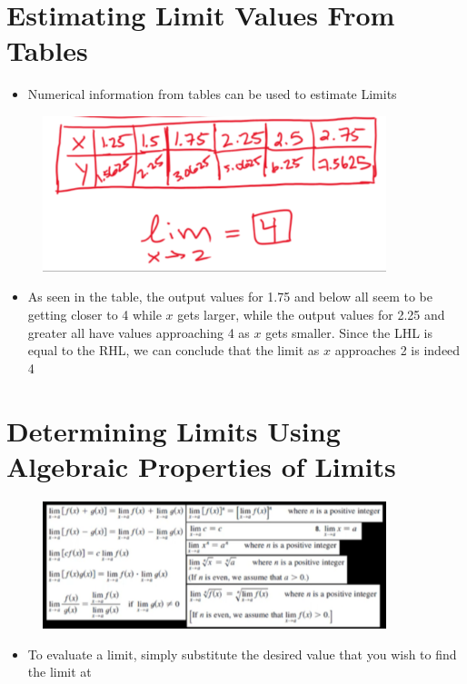 \documentclass{package/notes}
\begin{document}
\section{Estimating Limit Values From Tables}

\begin{itemize}
	\item Numerical information from tables can be used to estimate Limits
\end{itemize}

\begin{figure}
	\begin{center}
		\includegraphics[width=10cm]{images/1.4_Image.PNG}
	\end{center}
\end{figure}

\begin{itemize}
	\item As seen in the table, the output values for 1.75 and below all seem to be getting closer to 4 while $x$ gets larger,
	while the output values for 2.25 and greater all have values approaching 4 as $x$ gets smaller. Since the LHL is equal to the RHL, we can conclude that the limit as $x$ approaches 2 is indeed 4 
\end{itemize}

\section{Determining Limits Using Algebraic Properties of Limits}

\begin{figure}
	\begin{center}
		\includegraphics[width=10cm]{images/1.5_Image.PNG}
	\end{center}
\end{figure}

\begin{itemize}
	\item To evaluate a limit, simply substitute the desired value that you wish to find the limit at
\end{itemize}
\end{document}
